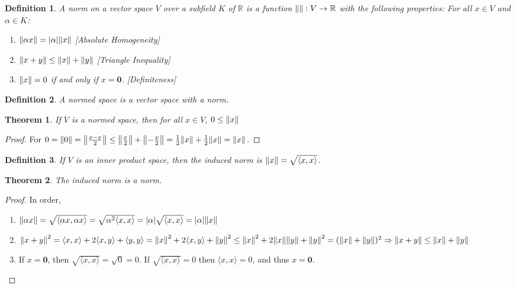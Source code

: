\documentclass[12pt,oneside]{book}
\theoremstyle{mystyle}
\newtheorem{theorem}{Theorem}[section]
\newtheorem{definition}{Definition}[section]
\begin{document}
\begin{definition}
A norm on a vector space $V$ over a subfield $K$ of $\mathbb{R}$ is a function $\norm{}:V\rightarrow \mathbb{R}$ with the following properties: For all $x \in V$ and $\alpha \in K$:
\begin{enumerate}
\item $\norm{\alpha x} = |\alpha| \norm{x}$ \hfill [Absolute Homogeneity]
\item $\norm{x+y} \leq \norm{x}+\norm{y}$ \hfill [Triangle Inequality]
\item $\norm{x} = 0$ if and only if $x = \mathbf{0}$. \hfill [Definiteness]
\end{enumerate}
\end{definition}

\begin{definition}
A normed space is a vector space with a norm.
\end{definition}

\begin{theorem}
If $V$ is a normed space, then for all $x\in V$, $0\leq \norm{x}$
\end{theorem}
\begin{proof}
For $0=\norm{0} = \norm{\frac{x-x}{2}} \leq \norm{\frac{x}{2}}+\norm{-\frac{x}{2}} = \frac{1}{2}\norm{x} + \frac{1}{2}\norm{x} = \norm{x}$.
\end{proof}

\begin{definition}
If $V$ is an inner product space, then the induced norm is $\norm{x}=\sqrt{\langle x,x \rangle}$.
\end{definition}

\begin{theorem}
The induced norm is a norm.
\end{theorem}
\begin{proof}
In order,
\begin{enumerate}
\item $\norm{\alpha x} = \sqrt{\langle \alpha x, \alpha x \rangle} = \sqrt{\alpha^2 \langle x,x\rangle} = |\alpha| \sqrt{\langle x,x \rangle} = |\alpha| \norm{x}$
\item $\norm{x+y}^2= \langle x,x \rangle + 2\langle x,y \rangle + \langle y,y \rangle = \norm{x}^2 + 2\langle x,y \rangle + \norm{y}^2 \leq \norm{x}^2 +2\norm{x}\norm{y} + \norm{y}^2 = (\norm{x}+\norm{y})^2\Rightarrow \norm{x+y}\leq \norm{x}+\norm{y}$
\item If $x= \mathbf{0}$, then $\sqrt{\langle x,x \rangle} = \sqrt{0} = 0$. If $\sqrt{\langle x,x \rangle} = 0$ then $\langle x,x \rangle = 0$, and thus $x = \mathbf{0}$.
\end{enumerate}
\end{proof}
\end{document}
